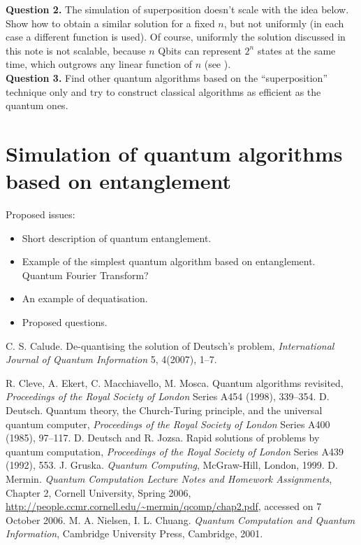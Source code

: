 \documentclass[11pt]{article}
\begin{document}
{\bf Question 2. } The simulation of superposition doesn't scale with the
idea below. Show how to obtain a similar solution  for a fixed $n$, but not uniformly (in each case a different function is used).
Of course, uniformly the solution discussed in this note is not scalable, because  $n$ Qbits can represent $2^n$
states at the same time, which outgrows any linear function of $n$ (see \cite{DJ92}).\\


{\bf Question 3. } Find other quantum algorithms based on the ``superposition'' technique only and try to construct classical algorithms as efficient as the quantum ones.

\section{Simulation of quantum algorithms based on entanglement}

Proposed issues:
\begin{itemize}
\item
Short description of quantum entanglement.
\item
Example of the simplest quantum algorithm based on entanglement. Quantum Fourier Transform?

\item An example of dequatisation.
\item Proposed questions.


\end{itemize}


\begin{thebibliography}{99}
 C. S. Calude. De-quantising  the  solution of Deutsch's
problem, {\em International Journal of Quantum Information} 5, 4(2007), 1--7.

 R. Cleve, A. Ekert, C. Macchiavello,  M. Mosca. Quantum algorithms revisited, {\em   Proceedings of the Royal Society of London}  Series  A454 (1998), 339--354.
 D. Deutsch.  Quantum theory, the Church-Turing principle, and the universal quantum computer, {\em Proceedings of the Royal Society of London}  Series  A400 (1985),  97--117.
 D. Deutsch and R. Jozsa.  Rapid solutions of problems by  quantum
computation,  {\em Proceedings of the Royal Society of London}  Series A439 (1992),  553.
 J. Gruska. {\it Quantum Computing}, McGraw-Hill, London, 1999.
 D. Mermin. {\em Quantum Computation
Lecture Notes and Homework Assignments}, Chapter 2,
Cornell University, Spring 2006, \url{http://people.ccmr.cornell.edu/~mermin/qcomp/chap2.pdf}, accessed on 7 October 2006.
 M. A. Nielsen, I. L. Chuang. {\em Quantum Computation and Quantum Information}, Cambridge University Press, Cambridge, 2001.
\end{thebibliography}
\end{document}
